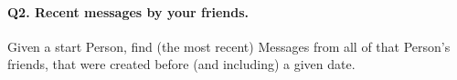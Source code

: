\paragraph{\textbf{Q2}. Recent messages by your friends.}
Given a start Person, find (the most recent) Messages from all of that
Person's friends, that were created before (and including) a given date.
